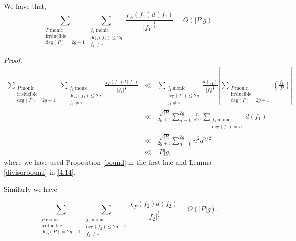 \documentclass[11pt]{amsart}
\begin{document}
\begin{prop}
\label{prop4.7}
We have that,
\begin{equation}
\sum_{\substack{P \ \mathrm{monic} \\ \mathrm{irrducible} \\ \mathrm{deg}(P)=2g+1}}\sum_{\substack{f_{1} \ \mathrm{monic} \\ \mathrm{deg}(f_{1})\leq2g \\ f_{1}\neq\square}}\frac{\chi_{P}(f_{1})d(f_{1})}{|f_{1}|^{\tfrac{1}{2}}}=O\left(|P|g\right).
\end{equation}
\end{prop}

\begin{proof}
\begin{eqnarray}
\sum_{\substack{P \ \mathrm{monic} \\ \mathrm{irrducible} \\ \mathrm{deg}(P)=2g+1}}\sum_{\substack{f_{1} \ \mathrm{monic} \\ \mathrm{deg}(f_{1})\leq2g \\ f_{1}\neq\square}}\frac{\chi_{P}(f_{1})d(f_{1})}{|f_{1}|^{\tfrac{1}{2}}}&\ll&\sum_{\substack{f_{1} \ \mathrm{monic} \\ \mathrm{deg}(f_{1})\leq2g \\ f_{1}\neq\square}}\frac{d(f_{1})}{|f_{1}|^{\tfrac{1}{2}}}\left|\sum_{\substack{P \ \mathrm{monic} \\ \mathrm{irrducible} \\ \mathrm{deg}(P)=2g+1}}\left(\frac{f_{1}}{P}\right)\right|\nonumber\\
\label{4.14}&\ll&\frac{\sqrt{|P|}}{2g+1}\sum_{n=0}^{2g}\frac{n}{q^{n/2}}\sum_{\substack{f_{1} \ \mathrm{monic} \\ \mathrm{deg}(f_{1})=n}}d(f_{1})\\
&\ll&\frac{\sqrt{|P|}}{2g+1}\sum_{n=0}^{2g}n^{2}q^{n/2}\nonumber\\
&\ll&|P|g,\nonumber
\end{eqnarray}
where we have used Proposition \ref{bound} in the first line and Lemma \ref{divisorbound} in \eqref{4.14}.
\end{proof}

Similarly we have

\begin{prop}
\label{prop4.8}
\begin{equation}
\sum_{\substack{P \ \mathrm{monic} \\ \mathrm{irrducible} \\ \mathrm{deg}(P)=2g+1}}\sum_{\substack{f_{2} \ \mathrm{monic} \\ \mathrm{deg}(f_{2})\leq2g-1 \\ f_{2}\neq\square}}\frac{\chi_{P}(f_{2})d(f_{2})}{|f_{2}|^{\tfrac{1}{2}}}=O\left(|P|g\right).
\end{equation}
\end{prop}
\end{document}
